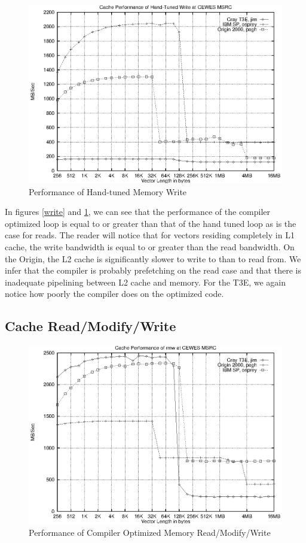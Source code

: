 \documentclass [12pt]{article}
\begin{document}
\begin{figure}[Hht]
\centerline{\includegraphics{pics/cache_cewes_handwrite.ps}}
\caption{Performance of Hand-tuned Memory Write}\label{handwrite}
\end{figure}

In figures \ref{write} and \ref{handwrite}, we can see that the performance of
the compiler optimized loop is equal to or greater than that of the hand 
tuned loop as is the case for reads.
The reader will notice that for vectors residing completely in L1 cache,
the write bandwidth is equal to or greater than the read bandwidth. On the
Origin, the L2 cache is significantly slower to write to than to read from. 
We infer that the compiler is probably prefetching on the read case
and that there is inadequate pipelining between L2 cache and memory. For the
T3E, we again notice how poorly the compiler does on the optimized code.

\clearpage
\newpage

\subsection{Cache Read/Modify/Write}
\begin{figure}[Hht]
\centerline{\includegraphics{pics/cache_cewes_rmw.ps}}
\caption{Performance of Compiler Optimized Memory Read/Modify/Write}\label{rmw}
\end{figure}
\end{document}
